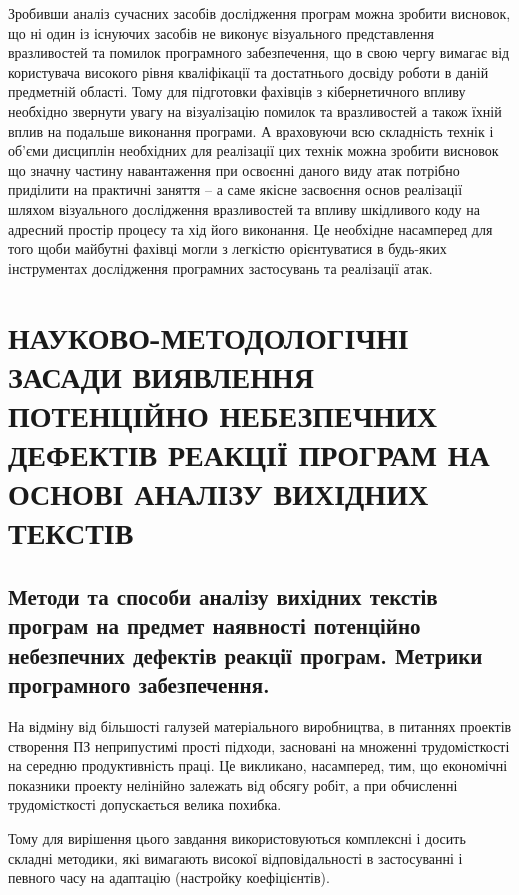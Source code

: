 \documentclass[oneside,final,14pt]{extreport}
\begin{document}
Зробивши аналіз сучасних засобів дослідження програм можна зробити висновок, що ні один із існуючих засобів не виконує візуального представлення вразливостей та помилок програмного забезпечення, що в свою чергу вимагає від користувача високого рівня кваліфікації та достатнього досвіду роботи в даній предметній області.
Тому для підготовки фахівців з кібернетичного впливу необхідно звернути увагу на візуалізацію помилок та вразливостей а також їхній вплив на подальше виконання програми.  А враховуючи всю складність технік і об’єми дисциплін необхідних для реалізації цих технік можна зробити висновок що значну частину навантаження при освоєнні даного виду атак потрібно приділити на практичні заняття – а саме якісне засвоєння основ реалізації шляхом візуального дослідження вразливостей та впливу шкідливого коду на адресний простір процесу та хід його виконання. Це необхідне насамперед для  того щоби майбутні фахівці могли з легкістю орієнтуватися в будь-яких інструментах дослідження програмних застосувань та реалізації атак.
\pagebreak

\chapter{НАУКОВО-МЕТОДОЛОГІЧНІ ЗАСАДИ ВИЯВЛЕННЯ ПОТЕНЦІЙНО НЕБЕЗПЕЧНИХ ДЕФЕКТІВ РЕАКЦІЇ ПРОГРАМ НА ОСНОВІ АНАЛІЗУ ВИХІДНИХ ТЕКСТІВ}
\label{2section::doc}\label{2section:id1}

\section{Методи та способи аналізу вихідних текстів програм на предмет наявності потенційно небезпечних дефектів реакції програм. Метрики програмного забезпечення.}
\label{2section:id2}
На відміну від більшості галузей матеріального виробництва, в питаннях проектів створення ПЗ неприпустимі прості підходи, засновані на множенні трудомісткості на середню продуктивність праці. Це викликано, насамперед, тим, що економічні показники проекту нелінійно залежать від обсягу робіт, а при обчисленні трудомісткості допускається велика похибка.

Тому для вирішення цього завдання використовуються комплексні і досить складні методики, які вимагають високої відповідальності в застосуванні і певного часу на адаптацію (настройку коефіцієнтів).
\end{document}
